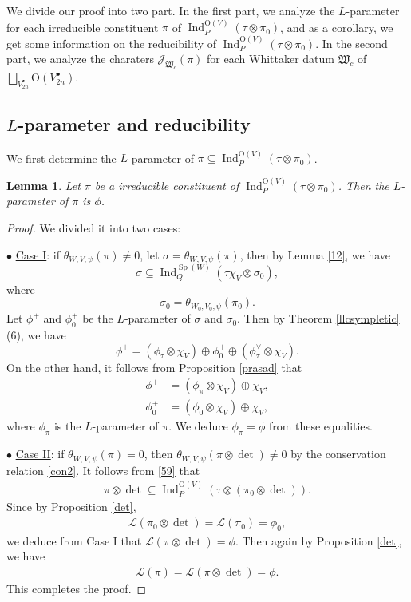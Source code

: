\documentclass[article]{article}
\numberwithin{equation}{section}
\newtheorem{lemma}[theorem]{Lemma}
\theoremstyle{definition}
\DeclareMathOperator{\Ind}{Ind}
\DeclareMathOperator{\SP}{Sp}
\begin{document}
We divide our proof into two part. In the first part, we analyze the $L$-parameter for each irreducible constituent $\pi$ of $\Ind_{P}^{\mathrm O(V)}(\tau\otimes \pi_0)$, and as a corollary, we get some information on the reducibility of $\Ind_{P}^{\mathrm O(V)}(\tau\otimes \pi_0)$. In the second part, we analyze the charaters $\mathcal J_{\mathfrak W_c}(\pi)$ for each Whittaker datum $\mathfrak W_c$ of $\bigsqcup_{V_{2n}^{\bullet}} \mathrm O(V_{2n}^\bullet)$.

\subsection{$L$-parameter and reducibility}
We first determine the $L$-parameter of $\pi\subseteq \Ind_{P}^{\mathrm O(V)}(\tau\otimes \pi_0)$.
\begin{lemma}\label{parameter}
	Let $\pi$ be a irreducible constituent of $\Ind_{P}^{\mathrm O(V)}(\tau\otimes \pi_0)$. Then the $L$-parameter of $\pi$ is $\phi$. 
\end{lemma}
\begin{proof}
	We divided it into two cases: 
	
	$\bullet$ \underline{Case I}: if $\theta_{W,V,\psi}(\pi)\neq 0 $, let $\sigma=\theta_{W,V,\psi}(\pi)$, then by Lemma \ref{12}, we have 
	$$
	\sigma \subseteq \Ind_{Q}^{\SP(W)}\left(\tau\chi_{V}\otimes \sigma_{0}\right),
	$$
	where  
	$$\sigma_{0}=
	\theta_{W_0,V_0,\psi}(\pi_0). 
	$$
	 Let $\phi^+$ and $\phi_{0}^+$ be the $L$-parameter of $\sigma$ and $\sigma_{0}$. Then by Theorem \ref{llcsympletic} (6), we have
	$$
	\phi^+=(\phi_{\tau}\otimes \chi_{V})\oplus \phi^+_{0} \oplus (\phi_{\tau}^{\vee}\otimes \chi_{V}).
	$$
	On the other hand, it follows from Proposition \ref{prasad} that 
	\begin{align*}
	\phi^+&=(\phi_{\pi}\otimes \chi_{V})\oplus \chi_{V} ,\\
	\phi^+_{0}&=(\phi_{0}\otimes\chi_{V})\oplus \chi_{V},
	\end{align*}
	where $\phi_{\pi}$ is the $L$-parameter of $\pi$. We deduce $\phi_{\pi}=\phi$ from these equalities. 
	
	$\bullet$ \underline{Case II}: if $\theta_{W,V,\psi}(\pi)= 0 $, then $\theta_{W,V,\psi}(\pi\otimes\det)\neq 0$ by the conservation relation \ref{con2}. It follows from \ref{59} that 
	\begin{align*}
	\pi\otimes\det \subseteq \Ind_{P}^{\mathrm O(V)}(\tau\otimes (\pi_0\otimes\det)). 
	\end{align*} 
	 Since by Proposition \ref{det},
	\begin{align*}
	\mathcal L(\pi_0\otimes\det)=\mathcal L(\pi_0)=\phi_0, 
	\end{align*}
	we deduce from Case I that $\mathcal L(\pi\otimes\det)=\phi$. Then again by Proposition \ref{det}, we have 
	\begin{align*}
	\mathcal L(\pi)=\mathcal L(\pi\otimes\det)=\phi. 
	\end{align*}
	This completes the proof. 
\end{proof}
\end{document}
